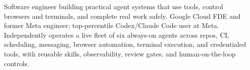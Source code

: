 


Software engineer building practical agent systems that use tools, control browsers and terminals, and complete real work safely. Google Cloud FDE and former Meta engineer; top-percentile Codex/Claude Code user at Meta. Independently operates a live fleet of six always-on agents across repos, CI, scheduling, messaging, browser automation, terminal execution, and credentialed tools, with reusable skills, observability, review gates, and human-on-the-loop controls.







